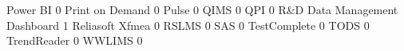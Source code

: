 \documentclass{article}
\begin{document}
\begin{Schunk}
\begin{Soutput}
  Power BI                                                        0
  Print on Demand                                                 0
  Pulse                                                           0
  QIMS                                                            0
  QPI                                                             0
  R&D Data Management Dashboard                                   1
  Reliasoft Xfmea                                                 0
  RSLMS                                                           0
  SAS                                                             0
  TestComplete                                                    0
  TODS                                                            0
  TrendReader                                                     0
  WWLIMS                                                          0
                                                           

\end{Soutput}
\end{Schunk}
\end{document}
